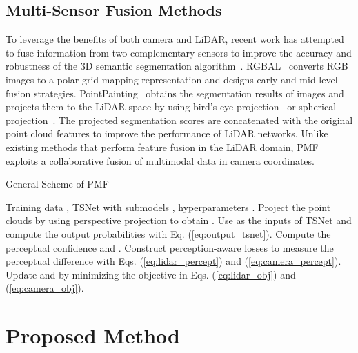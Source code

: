 \documentclass[10pt,twocolumn,letterpaper]{article}
\newcommand{\ice}[1]{{\color{black}#1}}
\begin{document}
\subsection{Multi-Sensor Fusion Methods}
\ice{To leverage the benefits of both camera and LiDAR, recent work has attempted to fuse information from two complementary sensors to improve the accuracy and robustness of the 3D semantic segmentation algorithm~\cite{krispel2020fuseseg,Madawy2019RGBAL,meyer2019sensor,vora2020pointpainting}.} RGBAL~\cite{Madawy2019RGBAL} converts RGB images to a polar-grid mapping representation and designs early and mid-level fusion strategies. 
PointPainting~\cite{vora2020pointpainting} obtains the segmentation results of images and projects them to the LiDAR space by using bird's-eye projection~\cite{zhang2020polarnet} or spherical projection~\cite{milioto2019rangenet++}. The projected segmentation scores are concatenated with the original point cloud features to improve the performance of LiDAR networks. 
Unlike existing methods that perform feature fusion in the LiDAR domain, PMF exploits a collaborative fusion of multimodal data in camera coordinates.













\begin{algorithm}[t]
    \caption{General Scheme of PMF}
    \begin{algorithmic}[1]
        \REQUIRE Training data , TSNet with submodels , hyperparameters .
\STATE Project the point clouds  by using perspective projection to obtain .
\STATE Use  as the inputs of TSNet and compute the output probabilities  with Eq. (\ref{eq:output_tsnet}).
            \STATE Compute the perceptual confidence  and .
\STATE Construct perception-aware losses to measure the perceptual difference with Eqs. (\ref{eq:lidar_percept}) and (\ref{eq:camera_percept}).
            \STATE Update  and  by minimizing the objective in Eqs. (\ref{eq:lidar_obj}) and (\ref{eq:camera_obj}).
        \ENDWHILE
    \end{algorithmic}
    \label{alg:optimization}
\end{algorithm}



\section{Proposed Method}
\end{document}
